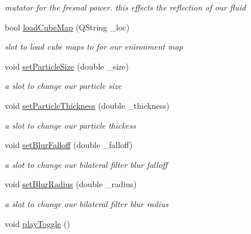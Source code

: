 \begin{DoxyCompactItemize}
\begin{DoxyCompactList}\small\item\em mutator for the fresnal power. this effects the reflection of our fluid \end{DoxyCompactList}\item 
bool \hyperlink{class_open_g_l_widget_ae26021ef3dd9a8f6a9fd68d4ce44a6ee}{load\-Cube\-Map} (Q\-String \-\_\-loc)
\begin{DoxyCompactList}\small\item\em slot to load cube maps to for our enironment map \end{DoxyCompactList}\item 
void \hyperlink{class_open_g_l_widget_a83bd4b62dc32eac33e84d570e31ddc1c}{set\-Particle\-Size} (double \-\_\-size)
\begin{DoxyCompactList}\small\item\em a slot to change our particle size \end{DoxyCompactList}\item 
void \hyperlink{class_open_g_l_widget_aef63bb4f820d5909837330d8cd220c20}{set\-Particle\-Thickness} (double \-\_\-thickness)
\begin{DoxyCompactList}\small\item\em a slot to change our particle thickess \end{DoxyCompactList}\item 
void \hyperlink{class_open_g_l_widget_a18386d03c765a2b49d947573d5e98561}{set\-Blur\-Falloff} (double \-\_\-falloff)
\begin{DoxyCompactList}\small\item\em a slot to change our bilateral filter blur falloff \end{DoxyCompactList}\item 
void \hyperlink{class_open_g_l_widget_a9115db4eeda180baaa8d14fae56d4ad2}{set\-Blur\-Radius} (double \-\_\-radius)
\begin{DoxyCompactList}\small\item\em a slot to change our bilateral filter blur radius \end{DoxyCompactList}\item 
\hypertarget{class_open_g_l_widget_a1b2f1e0736d69c0970823f9d31d908f7}{void \hyperlink{class_open_g_l_widget_a1b2f1e0736d69c0970823f9d31d908f7}{play\-Toggle} ()}\label{class_open_g_l_widget_a1b2f1e0736d69c0970823f9d31d908f7}


\end{DoxyCompactItemize}

